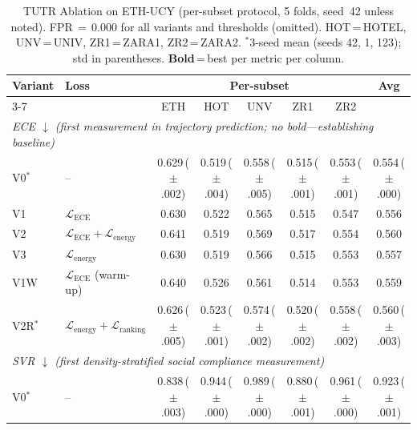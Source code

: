 \documentclass[journal]{IEEEtran}
\begin{document}
\begin{table}[t]
\caption{TUTR Ablation on ETH-UCY (per-subset protocol, 5 folds,
  seed~42 unless noted).
  FPR\,$=$\,0.000 for all variants and thresholds (omitted).
  HOT\,=\,HOTEL, UNV\,=\,UNIV, ZR1\,=\,ZARA1, ZR2\,=\,ZARA2.
  $^*$3-seed mean (seeds 42, 1, 123); std in parentheses.
  \textbf{Bold}\,=\,best per metric per column.}
\label{tab:ablation}
\centering
\setlength{\tabcolsep}{4.5pt}
\begin{tabular}{l l c c c c c c}
\toprule
\multirow{2}{*}{Variant} & \multirow{2}{*}{Loss} &
  \multicolumn{5}{c}{Per-subset} & \multirow{2}{*}{Avg} \\
\cmidrule(lr){3-7}
& & ETH & HOT & UNV & ZR1 & ZR2 & \\
\midrule
\multicolumn{8}{l}{\textit{ECE $\downarrow$ \quad
  (\emph{first measurement in trajectory prediction;
   no bold---establishing baseline})}} \\[1pt]
V0$^*$  & --
  & 0.629\,\scriptsize{({\tiny$\pm$.002})}
  & 0.519\,\scriptsize{({\tiny$\pm$.004})}
  & 0.558\,\scriptsize{({\tiny$\pm$.005})}
  & 0.515\,\scriptsize{({\tiny$\pm$.001})}
  & 0.553\,\scriptsize{({\tiny$\pm$.001})}
  & 0.554\,\scriptsize{({\tiny$\pm$.000})} \\
V1   & $\mathcal{L}_\text{ECE}$
  & 0.630 & 0.522 & 0.565 & 0.515 & 0.547 & 0.556 \\
V2   & $\mathcal{L}_\text{ECE}{+}\mathcal{L}_\text{energy}$
  & 0.641 & 0.519 & 0.569 & 0.517 & 0.554 & 0.560 \\
V3   & $\mathcal{L}_\text{energy}$
  & 0.630 & 0.519 & 0.566 & 0.515 & 0.553 & 0.557 \\
V1W  & $\mathcal{L}_\text{ECE}$ (warm-up)
  & 0.640 & 0.526 & 0.561 & 0.514 & 0.553 & 0.559 \\
V2R$^*$ & $\mathcal{L}_\text{energy}{+}\mathcal{L}_\text{ranking}$
  & 0.626\,\scriptsize{({\tiny$\pm$.005})}
  & 0.523\,\scriptsize{({\tiny$\pm$.001})}
  & 0.574\,\scriptsize{({\tiny$\pm$.002})}
  & 0.520\,\scriptsize{({\tiny$\pm$.002})}
  & 0.558\,\scriptsize{({\tiny$\pm$.002})}
  & 0.560\,\scriptsize{({\tiny$\pm$.003})} \\
\midrule
\multicolumn{8}{l}{\textit{SVR $\downarrow$ \quad
  (\emph{first density-stratified social compliance measurement})}} \\[1pt]
V0$^*$  & --
  & 0.838\,\scriptsize{({\tiny$\pm$.003})}
  & 0.944\,\scriptsize{({\tiny$\pm$.000})}
  & 0.989\,\scriptsize{({\tiny$\pm$.000})}
  & 0.880\,\scriptsize{({\tiny$\pm$.001})}
  & 0.961\,\scriptsize{({\tiny$\pm$.000})}
  & 0.923\,\scriptsize{({\tiny$\pm$.001})} \\

\end{tabular}
\end{table}
\end{document}
